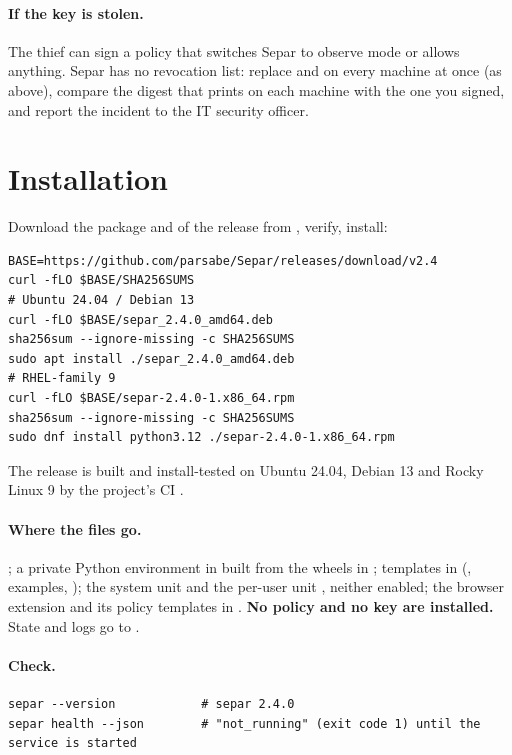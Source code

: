 \documentclass[11pt,a4paper]{article}
\begin{document}
\paragraph{If the key is stolen.} The thief can sign a policy that switches Separ to observe mode
or allows anything. Separ has no revocation list: replace  and  on
every machine at once (as above), compare the digest that  prints on each
machine with the one you signed, and report the incident to the IT security officer.

\section{Installation}
\label{sec:install}
Download the package and  of the release from \releases, verify, install:
\begin{lstlisting}
BASE=https://github.com/parsabe/Separ/releases/download/v2.4
curl -fLO $BASE/SHA256SUMS
# Ubuntu 24.04 / Debian 13
curl -fLO $BASE/separ_2.4.0_amd64.deb
sha256sum --ignore-missing -c SHA256SUMS
sudo apt install ./separ_2.4.0_amd64.deb
# RHEL-family 9
curl -fLO $BASE/separ-2.4.0-1.x86_64.rpm
sha256sum --ignore-missing -c SHA256SUMS
sudo dnf install python3.12 ./separ-2.4.0-1.x86_64.rpm
\end{lstlisting}
The release is built and install-tested on Ubuntu 24.04, Debian 13 and Rocky Linux 9 by the
project's CI .

\paragraph{Where the files go.} ; a private Python environment in
 built from the wheels in ; templates in
 (, examples, ); the system unit
 and the per-user unit
, neither enabled; the browser extension and its
policy templates in . \textbf{No policy and no key are installed.} State and
logs go to .

\paragraph{Check.}
\begin{lstlisting}
separ --version            # separ 2.4.0
separ health --json        # "not_running" (exit code 1) until the service is started
\end{lstlisting}
\end{document}
